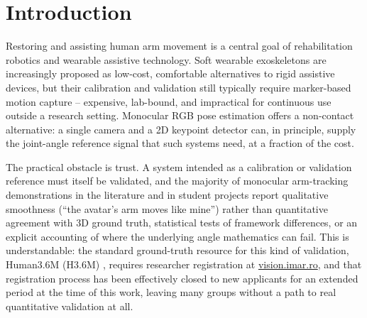 \documentclass[conference]{IEEEtran}
\begin{document}
\section{Introduction}

Restoring and assisting human arm movement is a central goal of
rehabilitation robotics and wearable assistive technology. Soft wearable
exoskeletons are increasingly proposed as low-cost, comfortable
alternatives to rigid assistive devices, but their calibration and
validation still typically require marker-based motion capture --
expensive, lab-bound, and impractical for continuous use outside a
research setting. Monocular RGB pose estimation offers a non-contact
alternative: a single camera and a 2D keypoint detector can, in
principle, supply the joint-angle reference signal that such systems
need, at a fraction of the cost.

The practical obstacle is trust. A system intended as a calibration or
validation reference must itself be validated, and the majority of
monocular arm-tracking demonstrations in the literature and in student
projects report qualitative smoothness (``the avatar's arm moves like
mine'') rather than quantitative agreement with 3D ground truth,
statistical tests of framework differences, or an explicit accounting of
where the underlying angle mathematics can fail. This is understandable:
the standard ground-truth resource for this kind of validation, Human3.6M
(H3.6M) \cite{ionescu2014human36m}, requires researcher registration at
\url{vision.imar.ro}, and that registration process has been effectively
closed to new applicants for an extended period at the time of this
work, leaving many groups without a path to real quantitative validation
at all.
\end{document}
